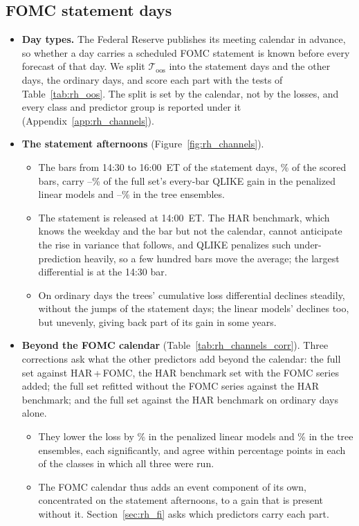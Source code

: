 \subsection{FOMC statement days}
\label{sec:rh_results_channels}
\begin{itemize}
\item \textbf{Day types.} The Federal Reserve publishes its meeting calendar in advance, so whether a day carries a
  scheduled FOMC statement is known before every forecast of that day. We split $\mathcal T_{\mathrm{oos}}$ into the
  \rhchNEventDays{} statement days and the \rhchNOrdDays{} other days, the ordinary days, and score each part with the
  tests of Table~\ref{tab:rh_oos}. The split is set by the calendar, not by the losses, and every class and predictor
  group is reported under it (Appendix~\ref{app:rh_channels}).
\item \textbf{The statement afternoons} (Figure~\ref{fig:rh_channels}).
  \begin{itemize}
  \item The bars from 14:30 to 16:00~ET of the statement days, \rhchEventPmBarPct\% of the scored bars, carry
    \rhchLinShareEventPmMin--\rhchLinShareEventPmMax\% of the full set's every-bar QLIKE gain in the penalized linear
    models and \rhchTreeShareEventPmMin--\rhchTreeShareEventPmMax\% in the tree ensembles.
  \item The statement is released at 14:00~ET. The HAR benchmark, which knows the weekday and the bar but not the
    calendar, cannot anticipate the rise in variance that follows, and QLIKE penalizes such under-prediction heavily,
    so a few hundred bars move the average; the largest differential is at the 14:30 bar.
  \item On ordinary days the trees' cumulative loss differential declines steadily, without the jumps of the statement
    days; the linear models' declines too, but unevenly, giving back part of its gain in some years.
  \end{itemize}
\item \textbf{Beyond the FOMC calendar} (Table~\ref{tab:rh_channels_corr}). Three corrections ask what the other
  predictors add beyond the calendar: the full set against HAR\,+\,FOMC, the HAR benchmark set with the FOMC series
  added; the full set refitted without the FOMC series against the HAR benchmark; and the full set against the HAR
  benchmark on ordinary days alone.
  \begin{itemize}
  \item They lower the loss by \rhchCorrLinRng\% in the penalized linear models and \rhchCorrTreeRng\% in the tree
    ensembles, each significantly, and agree within \rhchAgreePp{} percentage points in each of the \rhchNCorrAgree{}
    classes in which all three were run.
  \item The FOMC calendar thus adds an event component of its own, concentrated on the statement afternoons, to a
    gain that is present without it. Section~\ref{sec:rh_fi} asks which predictors carry each part.
  \end{itemize}
\end{itemize}











